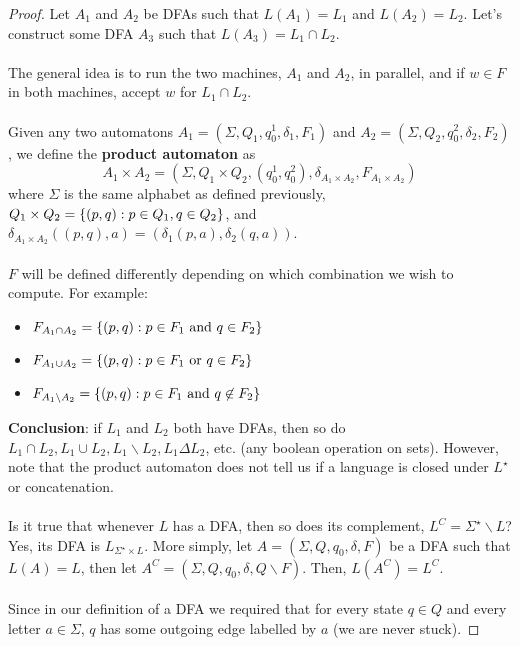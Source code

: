 \documentclass[]{article}
\DeclarePairedDelimiter{\set}{\lbrace}{\rbrace}
\theoremstyle{definition}
\begin{document}
        \begin{proof}
          Let $A_1$ and $A_2$ be DFAs such that $L(A_1) = L_1$ and $L(A_2) = L_2$. Let's construct some DFA $A_3$ such that $L(A_3) = L_1 \cap L_2$.
          \\ \\
          The general idea is to run the two machines, $A_1$ and $A_2$, in parallel, and if $w \in F$ in both machines, accept $w$ for $L_1 \cap L_2$.
          \\ \\
          Given any two automatons $A_1 = (\Sigma, Q_1, q_0^1, \delta_1, F_1)$ and $A_2 = (\Sigma, Q_2, q_0^2, \delta_2, F_2)$, we define the \textbf{product automaton} as
          $$
            A_1 \times A_2 = (\Sigma, Q_1 \times Q_2, (q_0^1, q_0^2), \delta_{A_1 \times A_2}, F_{A_1 \times A_2})
          $$
          where $\Sigma$ is the same alphabet as defined previously, $Q_1 \times Q_2 = \set{ (p, q) : p \in Q_1, q \in Q_2 }$, and $\delta_{A_1 \times A_2}((p, q), a) = (\delta_1(p, a), \delta_2(q, a))$.
          \\ \\
          $F$ will be defined differently depending on which combination we wish to compute. For example:
          \begin{itemize}
            \item $F_{A_1 \cap A_2} = \set{ (p, q) : p \in F_1 \text{ and } q \in F_2 }$
            \item $F_{A_1 \cup A_2} = \set{ (p, q) : p \in F_1 \text{ or } q \in F_2 }$
            \item $F_{A_1 \backslash A_2} = \set{ (p, q) : p \in F_1 \text{ and } q \not \in F_2 }$
          \end{itemize}

          \textbf{Conclusion}: if $L_1$ and $L_2$ both have DFAs, then so do $L_1 \cap L_2, L_1 \cup L_2, L_1 \backslash L_2, L_1 \Delta L_2$, etc. (any boolean operation on sets). However, note that the product automaton does not tell us if a language is closed under $L^\star$ or concatenation.
          \\ \\
          Is it true that whenever $L$ has a DFA, then so does its complement, $L^C = \Sigma^\star \backslash L$? Yes, its DFA is $L_{\Sigma^\star \times L}$. More simply, let $A = (\Sigma, Q, q_0, \delta, F)$ be a DFA such that $L(A) = L$, then let $A^C = (\Sigma, Q, q_0, \delta, Q \backslash F)$. Then, $L(A^C) = L^C$.
          \\ \\
          Since in our definition of a DFA we required that for every state $q \in Q$ and every letter $a \in \Sigma$, $q$ has some outgoing edge labelled by $a$ (we are never stuck).
        \end{proof}
\end{document}
